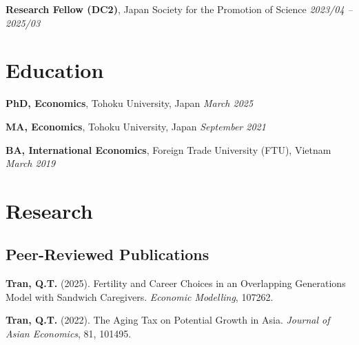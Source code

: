 \documentclass[12pt]{article}
\begin{document}
\textbf{Research Fellow (DC2)}, Japan Society for the Promotion of Science \hfill \emph{2023/04 -- 2025/03}


\section{Education}

\textbf{PhD, Economics}, Tohoku University, Japan \hfill \emph{March 2025} %

\textbf{MA, Economics}, Tohoku University, Japan \hfill \emph{September 2021}

\textbf{BA, International Economics}, Foreign Trade University (FTU), Vietnam \hfill \emph{March 2019}


\section{Research}

\subsection{Peer-Reviewed Publications}

\begin{enumerate}[label={[\arabic*]}]
\item \textbf{Tran, Q.T.} (2025). Fertility and Career Choices in an Overlapping Generations Model with Sandwich Caregivers. \textit{Economic Modelling}, 107262. 
\item \textbf{Tran, Q.T.} (2022). The Aging Tax on Potential Growth in Asia. \textit{Journal of Asian Economics}, 81, 101495. 
\end{enumerate}
\end{document}
